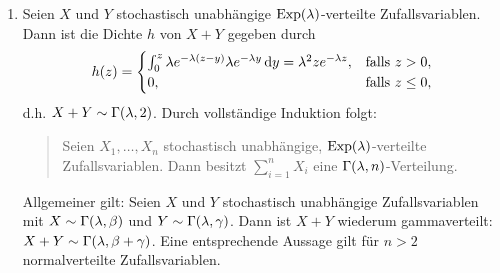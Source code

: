\documentclass{lecture}
\begin{document}
    \begin{example}
        \begin{enumerate}
            \item Seien \(X\) und \(Y\) stochastisch unabhängige \(\Exp\parentheses*{\lambda}\)-verteilte Zufallsvariablen.
            Dann ist die Dichte \(h\) von \(X + Y\) gegeben durch
            \[
                h\parentheses*{z} = \begin{cases}
                    \int_0^z \lambda e^{-\lambda\parentheses*{z - y}}\lambda e^{-\lambda y}\d y = \lambda^2 ze^{-\lambda z}, & \text{falls }z > 0,\\
                    0, & \text{falls }z \le 0,
                \end{cases}
            \]
            d.h. \(X + Y \sim \Gamma\parentheses*{\lambda, 2}\).
            Durch vollständige Induktion folgt:
            \begin{quote}
                Seien \(X_1, \ldots, X_n\) stochastisch unabhängige, \(\Exp\parentheses*{\lambda}\)-verteilte Zufallsvariablen.
                Dann besitzt \(\sum_{i = 1}^n X_i\) eine \(\Gamma\parentheses*{\lambda, n}\)-Verteilung.
            \end{quote}
            Allgemeiner gilt: Seien \(X\) und \(Y\) stochastisch unabhängige Zufallsvariablen mit \(X \sim \Gamma\parentheses*{\lambda, \beta}\) und \(Y \sim \Gamma\parentheses*{\lambda, \gamma}\).
            Dann ist \(X + Y\) wiederum gammaverteilt: \(X + Y \sim \Gamma\parentheses*{\lambda, \beta + \gamma}\).
            Eine entsprechende Aussage gilt für \(n > 2\) normalverteilte Zufallsvariablen.


\end{enumerate}
\end{example}
\end{document}
